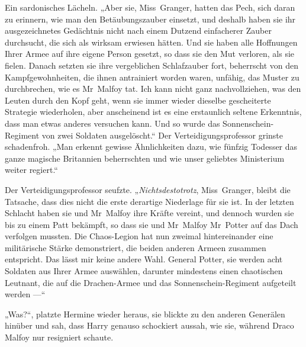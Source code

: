 Ein sardonisches Lächeln.
„Aber sie, Miss~Granger, hatten das Pech, sich daran zu erinnern, wie man den Betäubungszauber einsetzt, und deshalb haben sie ihr ausgezeichnetes Gedächtnis nicht nach einem Dutzend einfacherer Zauber durchsucht, die sich als wirksam erwiesen hätten. Und sie haben alle Hoffnungen Ihrer Armee auf ihre eigene Person gesetzt, so dass sie den Mut verloren, als sie fielen. Danach setzten sie ihre vergeblichen Schlafzauber fort, beherrscht von den Kampfgewohnheiten, die ihnen antrainiert worden waren, unfähig, das Muster zu durchbrechen, wie es Mr~Malfoy tat. Ich kann nicht ganz nachvollziehen, was den Leuten durch den Kopf geht, wenn sie immer wieder dieselbe gescheiterte Strategie wiederholen, aber anscheinend ist es eine erstaunlich seltene Erkenntnis, dass man etwas anderes versuchen kann. Und so wurde das Sonnenschein-Regiment von zwei Soldaten ausgelöscht.“ Der Verteidigungsprofessor grinste schadenfroh.
„Man erkennt gewisse Ähnlichkeiten dazu, wie fünfzig Todesser das ganze magische Britannien beherrschten und wie unser geliebtes Ministerium weiter regiert.“

Der Verteidigungsprofessor seufzte.
„\emph{Nichtsdestotrotz}, Miss~Granger, bleibt die Tatsache, dass dies nicht die erste derartige Niederlage für sie ist. In der letzten Schlacht haben sie und Mr~Malfoy ihre Kräfte vereint, und dennoch wurden sie bis zu einem Patt bekämpft, so dass sie und Mr~Malfoy Mr~Potter auf das Dach verfolgen mussten. Die Chaos-Legion hat nun zweimal hintereinander eine militärische Stärke demonstriert, die beiden anderen Armeen zusammen entspricht. Das lässt mir keine andere Wahl. General Potter, sie werden acht Soldaten aus Ihrer Armee auswählen, darunter mindestens einen chaotischen Leutnant, die auf die Drachen-Armee und das Sonnenschein-Regiment aufgeteilt werden —“

„Was?“, platzte Hermine wieder heraus, sie blickte zu den anderen Generälen hinüber und sah, dass Harry genauso schockiert aussah, wie sie, während Draco Malfoy nur resigniert schaute.

